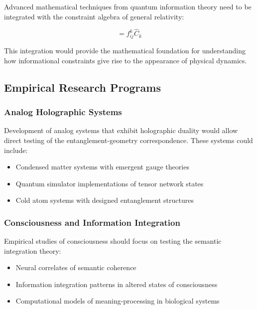 \documentclass[12pt,a4paper]{article}
\newcommand{\op}[1]{\hat{#1}}
\begin{document}
Advanced mathematical techniques from quantum information theory need to be integrated with the constraint algebra of general relativity:

\begin{equation}
    [\op{C}_i, \op{C}_j] = f_{ij}^k \op{C}_k
\end{equation}

This integration would provide the mathematical foundation for understanding how informational constraints give rise to the appearance of physical dynamics.

\subsection{Empirical Research Programs}

\subsubsection{Analog Holographic Systems}

Development of analog systems that exhibit holographic duality would allow direct testing of the entanglement-geometry correspondence. These systems could include:

\begin{itemize}
    \item Condensed matter systems with emergent gauge theories
    \item Quantum simulator implementations of tensor network states
    \item Cold atom systems with designed entanglement structures
\end{itemize}

\subsubsection{Consciousness and Information Integration}

Empirical studies of consciousness should focus on testing the semantic integration theory:

\begin{itemize}
    \item Neural correlates of semantic coherence
    \item Information integration patterns in altered states of consciousness
    \item Computational models of meaning-processing in biological systems
\end{itemize}
\end{document}
